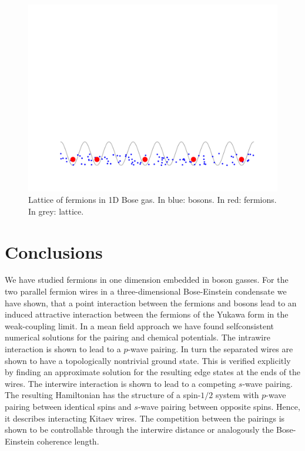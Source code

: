 \documentclass[11pt, twoside]{Thesis}
\begin{document}
\begin{figure}[H]
\center
\includegraphics[width=0.8\columnwidth]{gasandlattice2.pdf}
\\ Lattice of fermions in 1D Bose gas. In blue: bosons. In red: fermions. In grey: lattice.   
\end{figure}

\newpage



\part{Conclusions}
\chead{}
We have studied fermions in one dimension embedded in boson gasses. For the two parallel fermion wires in a three-dimensional Bose-Einstein condensate we have shown, that a point interaction between the fermions and bosons lead to an induced attractive interaction between the fermions of the Yukawa form in the weak-coupling limit. In a mean field approach we have found selfconsistent numerical solutions for the pairing and chemical potentials. The intrawire interaction is shown to lead to a $p$-wave pairing. In turn the separated wires are shown to have a topologically nontrivial ground state. This is verified explicitly by finding an approximate solution for the resulting edge states at the ends of the wires. The interwire interaction is shown to lead to a competing $s$-wave pairing. The resulting Hamiltonian has the structure of a spin-$1/2$ system with $p$-wave pairing between identical spins and $s$-wave pairing between opposite spins. Hence, it describes interacting Kitaev wires. The competition between the pairings is shown to be controllable through the interwire distance or analogously the Bose-Einstein coherence length. 
\end{document}
